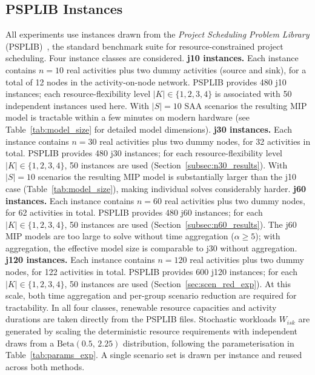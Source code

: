 \subsection{PSPLIB Instances}
\label{subsec:psplib}
All experiments use instances drawn from the
\emph{Project Scheduling Problem Library}
(PSPLIB)~\parencite{Kolisch1997}, the standard
benchmark suite for resource-constrained project scheduling.
Four instance classes are considered.
\textbf{j10 instances.}
Each instance contains $n = 10$ real activities plus two dummy
activities (source and sink), for a total of 12 nodes in the
activity-on-node network. PSPLIB provides 480 j10 instances;
each resource-flexibility level $|K| \in \{1,2,3,4\}$ is
associated with 50 independent instances used here.
With $|S|=10$ SAA scenarios the resulting MIP model is
tractable within a few minutes on modern hardware
(see Table~\ref{tab:model_size} for detailed model dimensions).
\textbf{j30 instances.}
Each instance contains $n = 30$ real activities plus two dummy
nodes, for 32 activities in total.
PSPLIB provides 480 j30 instances; for each resource-flexibility
level $|K| \in \{1,2,3,4\}$, 50 instances are used
(Section~\ref{subsec:n30_results}).
With $|S|=10$ scenarios the resulting MIP model is substantially
larger than the j10 case (Table~\ref{tab:model_size}), making
individual solves considerably harder.
\textbf{j60 instances.}
Each instance contains $n = 60$ real activities plus two dummy
nodes, for 62 activities in total.
PSPLIB provides 480 j60 instances; for each $|K| \in \{1,2,3,4\}$,
50 instances are used (Section~\ref{subsec:n60_results}).
The j60 MIP models are too large to solve without time
aggregation ($\alpha \geq 5$); with aggregation, the effective
model size is comparable to j30 without aggregation.
\textbf{j120 instances.}
Each instance contains $n = 120$ real activities plus two dummy
nodes, for 122 activities in total.
PSPLIB provides 600 j120 instances; for each
$|K| \in \{1,2,3,4\}$, 50 instances are used
(Section~\ref{sec:scen_red_exp}).
At this scale, both time aggregation and per-group scenario
reduction are required for tractability.
In all four classes, renewable resource capacities and activity
durations are taken directly from the PSPLIB files. Stochastic
workloads $W_{isk}$ are generated by scaling the deterministic
resource requirements with independent draws from a
$\mathrm{Beta}(0.5,\,2.25)$ distribution, following the
parameterisation in Table~\ref{tab:params_exp}. A single
scenario set is drawn per instance and reused across both
methods.
